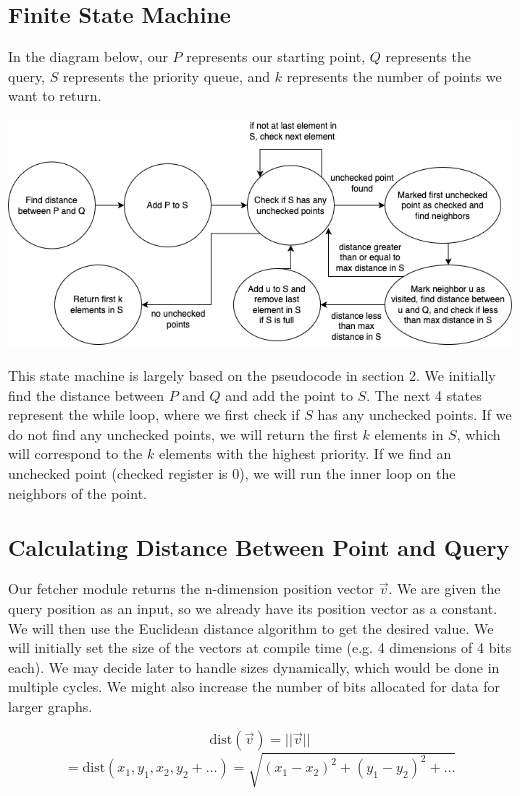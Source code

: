 \documentclass{article}
\begin{document}
\subsection{Finite State Machine}
In the diagram below, our $P$ represents our starting point, $Q$ represents the query, $S$ represents the priority queue, and $k$ represents the number of points we want to return.

\includegraphics[width=16cm]{FSM.drawio.png}

This state machine is largely based on the pseudocode in section 2. We initially find the distance between $P$ and $Q$ and add the point to $S$. The next 4 states represent the while loop, where we first check if $S$ has any unchecked points. If we do not find any unchecked points, we will return the first $k$ elements in $S$, which will correspond to the $k$ elements with the highest priority. If we find an unchecked point (checked register is 0), we will run the inner loop on the neighbors of the point.

\subsection{Calculating Distance Between Point and Query}

Our fetcher module returns the n-dimension position vector $\vec v$. We are given the query position as an input, so we already have its position vector as a constant. We will then use the Euclidean distance algorithm to get the desired value. We will initially set the size of the vectors at compile time (e.g. 4 dimensions of 4 bits each). We may decide later to handle sizes dynamically, which would be done in multiple cycles. We might also increase the number of bits allocated for data for larger graphs. 

$$\text{dist}(\vec v) = ||\vec v||$$
$$=\text{dist}(x_1,y_1,x_2,y_2+\dots)=\sqrt{(x_1-x_2)^2+(y_1-y_2)^2+\dots}$$
\end{document}

